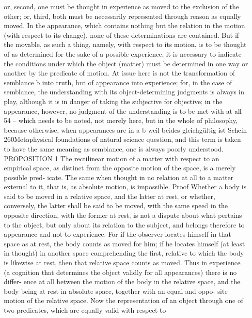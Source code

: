 or, second, one must be thought in experience as moved to the exclusion
of the other; or, third, both must be necessarily represented through
reason as equally moved. In the appearance, which contains nothing but
the relation in the motion (with respect to its change), none of these
determinations are contained. But if the movable, as such a thing, namely,
with respect to its motion, is to be thought of as determined for the sake
of a possible experience, it is necessary to indicate the conditions under
which the object (matter) must be determined in one way or another
by the predicate of motion. At issue here is not the transformation of
semblance b into truth, but of appearance into experience; for, in the case
of semblance, the understanding with its object-determining judgments
is always in play, although it is in danger of taking the subjective for
objective; in the appearance, however, no judgment of the understanding
is to be met with at all 54 – which needs to be noted, not merely here, but
in the whole of philosophy, because otherwise, when appearances are in
a
b
weil beides gleichgültig ist
Schein
260Metaphysical foundations of natural science
question, and this term is taken to have the same meaning as semblance,
one is always poorly understood.
PROPOSITION 1
The rectilinear motion of a matter with respect to an empirical space, as
distinct from the opposite motion of the space, is a merely possible pred-
icate. The same when thought in no relation at all to a matter external
to it, that is, as absolute motion, is impossible.
Proof
Whether a body is said to be moved in a relative space, and the latter
at rest, or whether, conversely, the latter shall be said to be moved, with
the same speed in the opposite direction, with the former at rest, is not a
dispute about what pertains to the object, but only about its relation to the
subject, and belongs therefore to appearance and not to experience. For
if the observer locates himself in that space as at rest, the body counts as
moved for him; if he locates himself (at least in thought) in another space
comprehending the ﬁrst, relative to which the body is likewise at rest,
then that relative space counts as moved. Thus in experience (a cognition
that determines the object validly for all appearances) there is no differ-
ence at all between the motion of the body in the relative space, and the
body being at rest in absolute space, together with an equal and oppo-
site motion of the relative space. Now the representation of an object
through one of two predicates, which are equally valid with respect to

